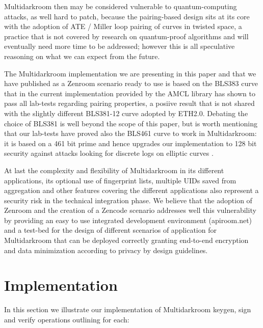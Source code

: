 \documentclass[twocolumn]{article}
\begin{document}
Multidarkroom then may be considered vulnerable to quantum-computing
attacks, as well hard to patch, because the pairing-based design sits at
its core with the adoption of ATE / Miller loop pairing of curves in
twisted space, a practice that is not covered by research on
quantum-proof algorithms and will eventually need more time to be
addressed; however this is all speculative reasoning on what we can
expect from the future.

The Multidarkroom implementation we are presenting in this paper and
that we have published as a Zenroom scenario ready to use is based on
the BLS383 curve \citep{bls383} that in the current implementation
provided by the AMCL library has shown to pass all lab-tests regarding
pairing properties, a posiive result that is not shared with the
slightly different BLS381-12 curve adopted by ETH2.0. Debating the
choice of BLS381 is well beyond the scope of this paper, but is worth
mentioning that our lab-tests have proved also the BLS461 curve to work
in Multidarkroom: it is based on a 461 bit prime and hence upgrades our
implementation to 128 bit security \citep{updating-key-pairings} against
attacks looking for discrete logs on elliptic curves
\citep{discrete-log-attack}.


At last the complexity and flexibility of Multidarkroom in its different applications, its optional use of fingerprint lists, multiple UIDs saved from aggregation and other features covering the different applications also represent a security risk in the technical integration phase. We believe that the adoption of Zenroom and the creation of a Zencode scenario addresses well this vulnerability by providing an easy to use integrated development environment (apiroom.net) and a test-bed for the design of different scenarios of application for Multidarkroom that can be deployed correctly granting end-to-end encryption and data minimization according to privacy by design guidelines. %

\section{Implementation}
\label{sec:implementation}

\lstset{basicstyle=\ttfamily\scriptsize, breaklines=true}

In this section we illustrate our implementation of Multidarkroom
keygen, sign and verify operations outlining for each:
\end{document}
